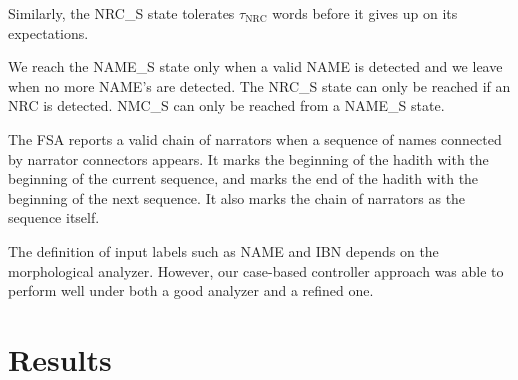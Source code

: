 \documentclass[11pt,letterpaper]{article}
\begin{document}
\begin{figure}[tb!]
\end{figure}

Similarly, the NRC\_S state tolerates $\tau_{\mbox{NRC}}$ words 
before it gives up on its expectations. 

We reach the NAME\_S state only when a
valid NAME is detected and we leave when no more NAME's are detected. 
The NRC\_S state can only be reached if an NRC is detected.
NMC\_S can only be reached from a NAME\_S state.

The FSA reports a valid chain of narrators when a sequence of names
connected by narrator connectors appears. 
It marks the beginning of the hadith with the beginning of the current sequence,
and marks the end of the hadith with the beginning of the next sequence. 
It also marks the chain of narrators as the sequence itself. 

The definition of input labels such as NAME and IBN depends on the 
morphological analyzer. 
However, our case-based controller approach was able to perform well
under both a good analyzer and a refined one. 


\section{Results}
\label{sec:results}
\end{document}
